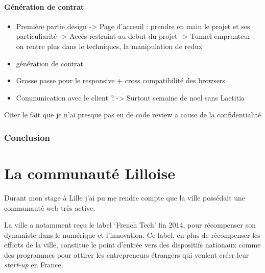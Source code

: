 \documentclass[12pt,a4paper]{article}
\begin{document}
  \bigskip

  \paragraph{Génération de contrat}\label{guxe9nuxe9ration-de-contrat}

  \bigskip

  \bigskip

  \begin{itemize}
  \item
    Première partie design -\textgreater{} Page d'acceuil : prendre en
    main le projet et ses particuliarité -\textgreater{} Accés restraint
    au debut du projet -\textgreater{} Tunnel emprunteur : on rentre plus
    dans le techniques, la manipulation de redux
  \item
    génération de contrat
  \item
    Grosse passe pour le responsive + cross compatibilité des browsers
  \item
    Communication avec le client ? -\textgreater{} Surtout semaine de noel
    sans Laetitia
  \end{itemize}

  Citer le fait que je n'ai presque pas eu de code review a cause de la
  confidentialité

  \subsubsection{Conclusion}\label{conclusion-1}

  \newpage

  \newpage

  \section{La communauté Lilloise}\label{la-communautuxe9-lilloise}

  Durant mon stage à Lille j'ai pu me rendre compte que la ville possédait
  une communauté web très active.

  \bigskip

  La ville a notamment reçu le label `French Tech' fin 2014, pour
  récompenser son dynamiste dans le numérique et l'innovation. Ce label,
  en plus de récompenser les efforts de la ville, constitue le point
  d'entrée vers des dispositifs nationaux comme des programmes pour
  attirer les entrepreneurs étrangers qui veulent créer leur
  \emph{start-up} en France.

  \bigskip
\end{document}
